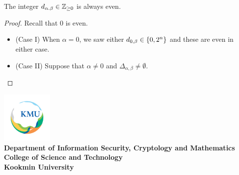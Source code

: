 \documentclass[11pt,openany]{article}
\newcommand{\footer}[1]{
\begin{flushright}
	\vspace{2em}
	\includegraphics[width=2.5cm]{school_logo.jpg} \\
	\vspace{1em}
	\textcolor{TealBlue2}{\small\textbf{#1}}
\end{flushright}
}
\begin{document}
\newpage

\begin{proposition}
	The integer $d_{\alpha.\beta}\in\mathbb{Z}_{\geq 0}$ is always even.
\end{proposition}
\begin{proof}
	Recall that $0$ is even.
	\begin{itemize}
		\item[] (Case I) When $\alpha=0$, we saw either $d_{0,\beta}\in\set{0,2^n}$ and these are even in either case.
		\item[] (Case II) Suppose that $\alpha\neq 0$ and $\Delta_{\alpha,\beta}\neq\emptyset$.
	\end{itemize}
\end{proof}

\newpage
\footer{Department of Information Security, Cryptology and Mathematics\\
	College of Science and Technology\\
	Kookmin University}

\newpage

%
%
\end{document}
